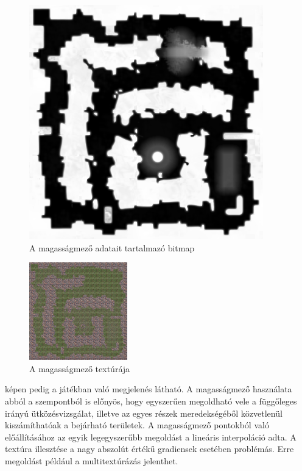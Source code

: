 \begin{figure}[h]
\centering
\includegraphics[scale=0.5]{kepek/heightmap.png}
\caption{A magasságmező adatait tartalmazó bitmap}
\label{fig:heightmap}
\end{figure}

\begin{figure}[h]
\centering
\includegraphics[scale=1.5]{kepek/heightmap_texture.png}
\caption{A magasságmező textúrája}
\label{fig:heightmap_texture}
\end{figure}

 képen pedig a játékban való megjelenés látható. A magasságmező használata abból a szempontból is előnyös, hogy egyszerűen megoldható vele a függőleges irányú ütközésvizsgálat, illetve az egyes részek meredekségéből közvetlenül kiszámíthatóak a bejárható területek. A magasságmező pontokból való előállításához az egyik legegyszerűbb megoldást a lineáris interpoláció adta. A textúra illesztése a nagy abszolút értékű gradiensek esetében problémás. Erre megoldást például a multitextúrázás jelenthet.

